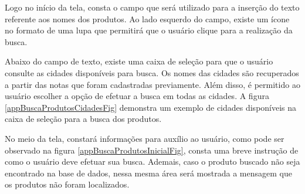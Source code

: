 Logo no início da tela, consta o campo que será utilizado para a inserção do texto referente aos nomes dos produtos. Ao lado esquerdo do campo, existe um ícone no formato de uma lupa que permitirá que o usuário clique para a realização da busca.

Abaixo do campo de texto, existe uma caixa de seleção para que o usuário consulte as cidades disponíveis para busca. Os nomes das cidades são recuperados a partir das notas que foram cadastradas previamente. Além disso, é permitido ao usuário escolher a opção de efetuar a busca em todas as cidades. A figura \ref{appBuscaProdutosCidadesFig} demonstra um exemplo de cidades disponíveis na caixa de seleção para a busca dos produtos.

No meio da tela, constará informações para auxílio ao usuário, como pode ser observado na figura \ref{appBuscaProdutosInicialFig}, consta uma breve instrução de como o usuário deve efetuar sua busca. Ademais, caso o produto buscado não seja encontrado na base de dados, nessa mesma área será mostrada a mensagem que os produtos não foram localizados.

